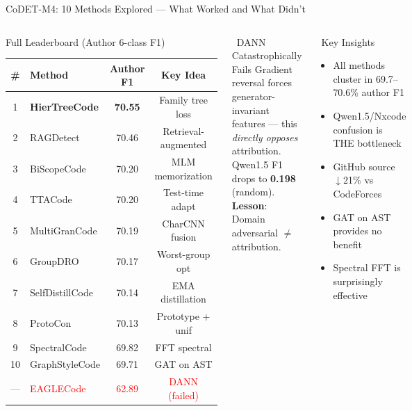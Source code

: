 \documentclass[aspectratio=169, 10pt]{beamer}
\begin{document}
\begin{frame}{CoDET-M4: 10 Methods Explored --- What Worked and What Didn't}
\vspace{-0.2cm}
\begin{columns}[T]
\begin{block}{Full Leaderboard (Author 6-class F1)}
\centering\scriptsize
\begin{tabular}{clcc}
\toprule
\textbf{\#} & \textbf{Method} & \textbf{Author F1} & \textbf{Key Idea} \\
\midrule
\rowcolor{oursgreen}
1 & \textbf{HierTreeCode} & \textbf{70.55} & Family tree loss \\
2 & RAGDetect & 70.46 & Retrieval-augmented \\
3 & BiScopeCode & 70.20 & MLM memorization \\
4 & TTACode & 70.20 & Test-time adapt \\
5 & MultiGranCode & 70.19 & CharCNN fusion \\
6 & GroupDRO & 70.17 & Worst-group opt \\
7 & SelfDistillCode & 70.14 & EMA distillation \\
8 & ProtoCon & 70.13 & Prototype + unif \\
\rowcolor{oursgreen}
9 & SpectralCode & 69.82 & FFT spectral \\
10 & GraphStyleCode & 69.71 & GAT on AST \\
\midrule
\textcolor{red}{---} & \textcolor{red}{EAGLECode} & \textcolor{red}{62.89} & \textcolor{red}{DANN (failed)} \\
\bottomrule
\end{tabular}
\end{block}

\begin{alertblock}{\faExclamationTriangle\ DANN Catastrophically Fails}
\scriptsize
Gradient reversal forces generator-invariant features --- this \emph{directly opposes} attribution.\\
Qwen1.5 F1 drops to \textbf{0.198} (random).\\
\textbf{Lesson}: Domain adversarial $\neq$ attribution.
\end{alertblock}

\begin{exampleblock}{\faLightbulb\ Key Insights}
\scriptsize
\begin{itemize}\setlength\itemsep{1pt}
    \item All methods cluster in 69.7--70.6\% author F1
    \item Qwen1.5/Nxcode confusion is THE bottleneck
    \item GitHub source $\downarrow$21\% vs CodeForces
    \item GAT on AST provides no benefit
    \item Spectral FFT is surprisingly effective
\end{itemize}
\end{exampleblock}
\end{columns}
\end{frame}
\end{document}
